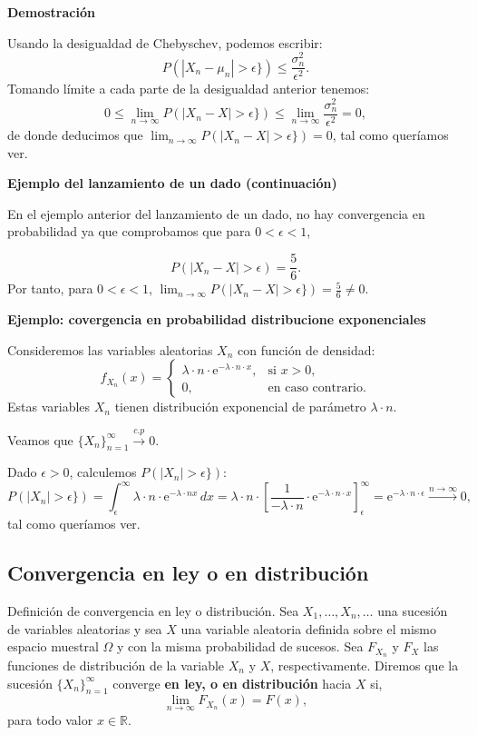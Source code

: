 \documentclass[]{book}
\begin{document}
\textbf{Demostración}

Usando la desigualdad de Chebyschev, podemos escribir:
\[
P(|X_n-\mu_n|>\epsilon \}) \leq \frac{\sigma_n^2}{\epsilon^2}.
\]
Tomando límite a cada parte de la desigualdad anterior tenemos:
\[
0\leq \lim_{n\to\infty} P(|X_n-X|>\epsilon \}) \leq \lim_{n\to\infty}\frac{\sigma_n^2}{\epsilon^2}=0,
\]
de donde deducimos que \(\lim_{n\to\infty} P(|X_n-X|>\epsilon \})=0\), tal como queríamos ver.

\textbf{Ejemplo del lanzamiento de un dado (continuación)}

En el ejemplo anterior del lanzamiento de un dado, no hay convergencia en probabilidad ya que comprobamos que para \(0<\epsilon<1\),

\[
P(|X_n-X|>\epsilon)=\frac{5}{6}.
\]
Por tanto, para \(0<\epsilon<1\), \(\lim_{n\to\infty} P(|X_n-X|>\epsilon \})=\frac{5}{6}\neq 0.\)

\textbf{Ejemplo: covergencia en probabilidad distribucione exponenciales}

Consideremos las variables aleatorias \(X_n\) con función de densidad:
\[
f_{X_n}(x)=\begin{cases}
\lambda\cdot  n\cdot\mathrm{e}^{-\lambda\cdot n\cdot  x}, & \mbox{si }x>0,\\
0, & \mbox{en caso contrario.}
\end{cases}
\]
Estas variables \(X_n\) tienen distribución exponencial de parámetro \(\lambda\cdot n\).

Veamos que \(\{X_n\}_{n=1}^\infty\stackrel{c.p}{\longrightarrow} 0\).

Dado \(\epsilon >0\), calculemos \(P(|X_n|>\epsilon \})\):
\[
P(|X_n|>\epsilon \}) = \int_\epsilon^\infty \lambda\cdot  n\cdot \mathrm{e}^{-\lambda\cdot  n x}\, dx =\lambda\cdot  n\cdot  \left[\frac{1}{-\lambda \cdot n}\cdot\mathrm{e}^{-\lambda\cdot  n\cdot  x}\right]_\epsilon^\infty =\mathrm{e}^{-\lambda\cdot  n\cdot  \epsilon}\stackrel{n\to\infty}{\longrightarrow} 0,
\]
tal como queríamos ver.

\hypertarget{convergencia-en-ley-o-en-distribuciuxf3n}{%
\subsection{Convergencia en ley o en distribución}\label{convergencia-en-ley-o-en-distribuciuxf3n}}

 Definición de convergencia en ley o distribución.
Sea \(X_1,\ldots,X_n,\ldots\) una sucesión de variables aleatorias y sea \(X\) una variable aleatoria definida sobre el mismo espacio muestral \(\Omega\) y con la misma probabilidad de sucesos. Sea \(F_{X_n}\) y \(F_X\) las funciones de distribución de la variable \(X_n\) y \(X\), respectivamente. Diremos que la sucesión \(\{X_n\}_{n=1}^\infty\) converge \textbf{en ley, o en distribución} hacia \(X\) si,
\[
\lim_{n\to\infty} F_{X_n}(x)=F(x),
\]
para todo valor \(x\in\mathbb{R}\).
\end{document}
